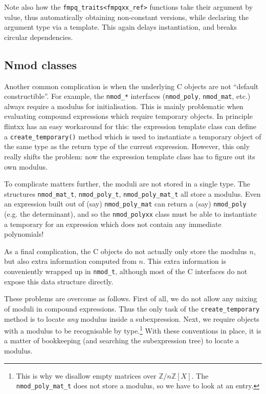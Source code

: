\documentclass[a4paper,10pt]{book}
\newcommand{\code}{\lstinline}
\begin{document}
{{Note also how the \code{fmpq_traits<fmpqxx_ref>} functions take their argument
by value, thus automatically obtaining non-constant versions, while declaring
the argument type via a template. This again delays instantiation, and breaks
circular dependencies.

\subsection{Nmod classes}

Another common complication is when the underlying C objects are not ``default
constructible''. For example, the \code{nmod_*} interfaces (\code{nmod_poly},
\code{nmod_mat}, etc.) always require a modulus for initialisation. This is
mainly problematic when evaluating compound expressions which require temporary
objects. In principle flintxx has an easy workaround for this: the expression
template class can define a \code{create_temporary()} method which is used to
instantiate a temporary object of the same type as the return type of the
current expression. However, this only really shifts the problem: now the
expression template class has to figure out its own modulus.

To complicate matters further, the moduli are not stored in a single type. The
structures \code{nmod_mat_t}, \code{nmod_poly_t}, \code{nmod_poly_mat_t} all
store a modulus. Even an expression built out of (say) \code{nmod_poly_mat} can
return a (say) \code{nmod_poly} (e.g. the determinant), and so the
\code{nmod_polyxx} class must be able to instantiate a temporary for an
expression which does not contain any immediate polynomials!

As a final complication, the C objects do not actually only store the modulus
$n$, but also extra information computed from $n$. This extra information is
conveniently wrapped up in \code{nmod_t}, although most of the C interfaces do
not expose this data structure directly.

These problems are overcome as follows. First of all, we do not allow any mixing
of moduli in compound expressions. Thus the only task of the
\code{create_temporary} method is to locate \emph{any} modulus inside a
subexpression. Next, we require objects with a modulus to be recognisable by
type.\footnote{This is why we disallow empty matrices over
$\mathbb{Z}/n\mathbb{Z}[X]$. The \code{nmod_poly_mat_t} does not store a
modulus, so we have to look at an entry.} With these conventions in place, it is
a matter of bookkeeping (and searching the subexpression tree) to locate a
modulus.

}}
\end{document}
